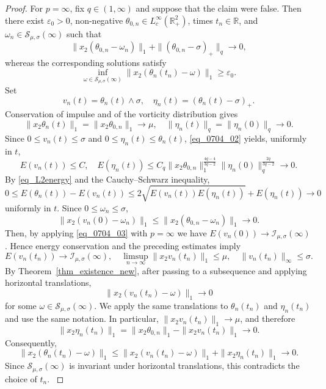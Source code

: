 \documentclass[10pt,a4paper]{amsart}
\theoremstyle{definition}
\theoremstyle{definition}
\numberwithin{equation}{section}
\newcommand{\0}{\emptyset}
\newcommand{\bbR}{\mathbb R}
\newcommand{\calI}{\mathcal I}
\newcommand{\calS}{\mathcal S}
\begin{document}
\begin{proof}
                {
                For $p = \infty$, fix $q \in (1, \infty)$ and suppose that the claim were false.
                Then there exist $\varepsilon_0 > 0$, non-negative $\theta_{0,n} \in L^\infty_c(\mathbb{R}^2_+)$, times $t_n \in \bbR$, and $\omega_n \in \calS_{\mu,\sigma}(\infty)$ such that
                \[
                \|x_2(\theta_{0,n} - \omega_n)\|_1 + \|(\theta_{0,n} - \sigma)_+\|_q \to 0,
                \]
                whereas the corresponding solutions satisfy
                \[
                \inf_{\omega \in \calS_{\mu,\sigma}(\infty)} \|x_2(\theta_n(t_n) - \omega)\|_1 \ge \varepsilon_0.
                \]
                Set
                \[
                v_n(t) = \theta_n(t) \wedge \sigma, \quad \eta_n(t) = (\theta_n(t) - \sigma)_+.
                \]
                Conservation of impulse and of the vorticity distribution gives
                \[
                \|x_2\theta_n(t)\|_1 = \|x_2\theta_{0,n}\|_1 \to \mu, \quad \|\eta_n(t)\|_q = \|\eta_n(0)\|_q \to 0.
                \]
                Since $0 \le v_n(t) \le \sigma$ and $0 \le \eta_n(t) \le \theta_n(t)$, \eqref{eq_0704_02} yields, uniformly in $t$,
                \[
                E(v_n(t)) \le C, \quad E(\eta_n(t)) \le C_q \|x_2\theta_{0,n}\|_1^{\frac{4q-4}{3q-2}} \|\eta_n(0)\|_q^{\frac{2q}{3q-2}} \to 0.
                \]
                By \eqref{eq_L2energy} and the Cauchy--Schwarz inequality,
                \[
                0 \le E(\theta_n(t)) - E(v_n(t)) \le 2\sqrt{E(v_n(t)) E(\eta_n(t))} + E(\eta_n(t))\to 0
                \]
                uniformly in $t$.
                Since $0\le \omega_n \le \sigma$,
                \[
                \|x_2(v_n(0) - \omega_n)\|_1 \le \|x_2(\theta_{0,n} - \omega_n)\|_1 \to 0.
                \]
                Then, by applying \eqref{eq_0704_03} with $p=\infty$ we have $E(v_n(0)) \to \calI_{\mu,\sigma}(\infty)$.
                Hence energy conservation and the preceding estimates imply
                \[
                E(v_n(t_n))\to\calI_{\mu,\sigma}(\infty), \quad \limsup_{n\to\infty}\|x_2v_n(t_n)\|_1 \le \mu, \quad \|v_n(t_n)\|_\infty \le \sigma.
                \]
                By Theorem~\ref{thm_existence_new}, after passing to a subsequence and applying horizontal translations,
                \[
                \|x_2(v_n(t_n) - \omega) \|_1 \to 0
                \]
                for some $\omega \in \calS_{\mu,\sigma}(\infty)$.
                We apply the same translations to $\theta_n(t_n)$ and $\eta_n(t_n)$ and use the same notation.
                In particular, $\|x_2 v_n(t_n)\|_1 \to \mu$, and therefore
                \[
                \|x_2\eta_n(t_n)\|_1 = \|x_2\theta_{0,n}\|_1 - \|x_2 v_n(t_n)\|_1 \to 0.
                \]
                Consequently,
                \[
                \|x_2(\theta_n(t_n)-\omega)\|_1 \le \|x_2(v_n(t_n)-\omega)\|_1 + \|x_2\eta_n(t_n)\|_1 \to 0.
                \]
                Since $\calS_{\mu,\sigma}(\infty)$ is invariant under horizontal translations, this contradicts the choice of $t_n$.
                }
			\end{proof}
\end{document}
